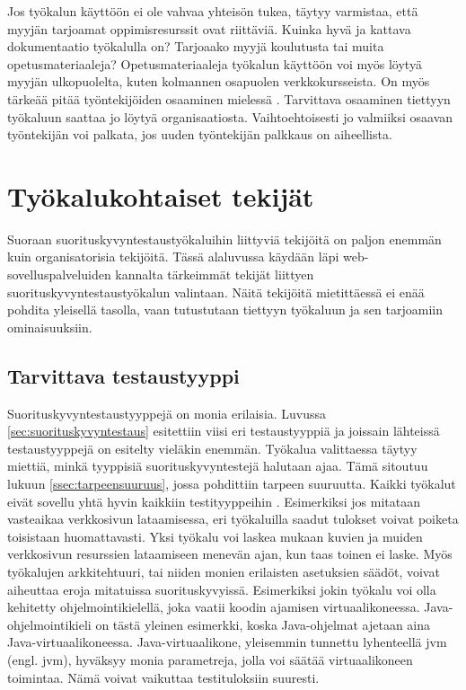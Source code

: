 Jos työkalun käyttöön ei ole vahvaa yhteisön tukea, täytyy varmistaa, että myyjän tarjoamat oppimisresurssit ovat riittäviä. Kuinka hyvä ja kattava dokumentaatio työkalulla on? Tarjoaako myyjä koulutusta tai muita opetusmateriaaleja? Opetusmateriaaleja työkalun käyttöön voi myös löytyä myyjän ulkopuolelta, kuten kolmannen osapuolen verkkokursseista. On myös tärkeää pitää työntekijöiden osaaminen mielessä \parencite[15]{TheArtOfApplication}. Tarvittava osaaminen tiettyyn työkaluun saattaa jo löytyä organisaatiosta. Vaihtoehtoisesti jo valmiiksi osaavan työntekijän voi palkata, jos uuden työntekijän palkkaus on aiheellista. 



\section{Työkalukohtaiset tekijät}
\label{sec:työkalukohtaisettekijät}
Suoraan suorituskyvyntestaustyökaluihin liittyviä tekijöitä on paljon enemmän kuin organisatorisia tekijöitä. Tässä alaluvussa käydään läpi web-sovelluspalveluiden kannalta tärkeimmät tekijät liittyen suorituskyvyntestaustyökalun valintaan. Näitä tekijöitä mietittäessä ei enää pohdita yleisellä tasolla, vaan tutustutaan tiettyyn työkaluun ja sen tarjoamiin ominaisuuksiin. 


\subsection{Tarvittava testaustyyppi}
\label{ssec:tarvittavatestaustyyppi}
Suorituskyvyntestaustyyppejä on monia erilaisia. Luvussa \ref{sec:suorituskyvyntestaus} esitettiin viisi eri testaustyyppiä ja joissain lähteissä testaustyyppejä on esitelty vieläkin enemmän. Työkalua valittaessa täytyy miettiä, minkä tyyppisiä suorituskyvyntestejä halutaan ajaa. Tämä sitoutuu lukuun \ref{ssec:tarpeensuuruus}, jossa pohdittiin tarpeen suuruutta. Kaikki työkalut eivät sovellu yhtä hyvin kaikkiin testityyppeihin \parencite{ScrutinizingAutomatedLoadTesting}. Esimerkiksi jos mitataan vasteaikaa verkkosivun lataamisessa, eri työkaluilla saadut tulokset voivat poiketa toisistaan huomattavasti. Yksi työkalu voi laskea mukaan kuvien ja muiden verkkosivun resurssien lataamiseen menevän ajan, kun taas toinen ei laske. \parencite{SoftwareAndPerformanceTestingTools} Myös työkalujen arkkitehtuuri, tai niiden monien erilaisten asetuksien säädöt, voivat aiheuttaa eroja mitatuissa suorituskyvyissä. Esimerkiksi jokin työkalu voi olla kehitetty ohjelmointikielellä, joka vaatii koodin ajamisen virtuaalikoneessa. Java-ohjelmointikieli on tästä yleinen esimerkki, koska Java-ohjelmat ajetaan aina Java-virtuaalikoneessa. Java-virtuaalikone, yleisemmin tunnettu lyhenteellä \acrshort{jvm} (engl. \acrlong{jvm}), hyväksyy monia parametreja, jolla voi säätää virtuaalikoneen toimintaa. Nämä voivat vaikuttaa testituloksiin suuresti. \parencite{PerformanceTestingAnalyzingFifferencesOfResponseTime} 

